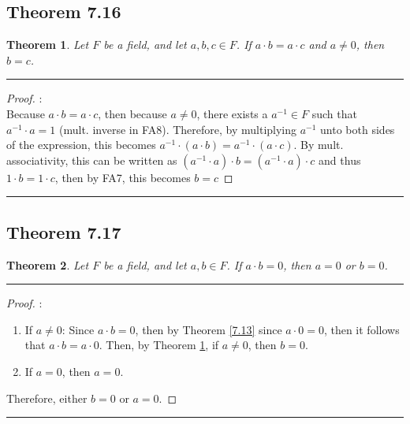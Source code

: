 \documentclass[openany, amssymb, psamsfonts]{amsart}
\newtheorem{thm}{Theorem}[section]
\theoremstyle{definition}
\numberwithin{equation}{section}
\begin{document}
\subsection*{Theorem 7.16}
\begin{thm}
\label{7.16}
	Let $F$ be a field, and let $a, b, c \in F$. If $a \cdot b = a \cdot c$ and $a \neq 0$, then $b = c$.
\end{thm}
\vspace{4pt}     \hrule   \vspace{4pt}
\begin{proof}:\\
    Because $a\cdot b = a\cdot c$, then because $a\neq 0$, there exists a $a^{-1}\in F$ such that $a^{-1} \cdot a = 1$ (mult. inverse in FA8). Therefore, by multiplying $a^{-1}$ unto both sides of the expression, this becomes $a^{-1}\cdot (a \cdot b) = a^{-1}\cdot (a \cdot c)$. By mult. associativity, this can be written as $(a^{-1}\cdot a) \cdot b = (a^{-1}\cdot a)\cdot c$ and thus $1\cdot b = 1\cdot c$, then by FA7, this becomes $b=c$
\end{proof}
\vspace{4pt}     \hrule   \vspace{4pt}

\subsection*{Theorem 7.17}
\begin{thm}
\label{7.17}
	Let $F$ be a field, and let $a, b\in F$.  If $a \cdot b = 0$, then $a = 0$ or $b = 0$.
\end{thm}

\vspace{4pt}     \hrule   \vspace{4pt}
\begin{proof}:\\
\begin{enumerate}
    \item If $a\neq 0$: Since $a\cdot b = 0$, then by Theorem \ref{7.13} since $a\cdot 0 =0$, then it follows that $a\cdot b = a\cdot 0$. Then, by Theorem \ref{7.16}, if $a\neq 0$, then $b=0$. 
    \item If $a=0$, then $a=0$.
\end{enumerate}
Therefore, either $b=0$ or $a=0$.
\end{proof}
\vspace{4pt}     \hrule   \vspace{4pt}
\end{document}
